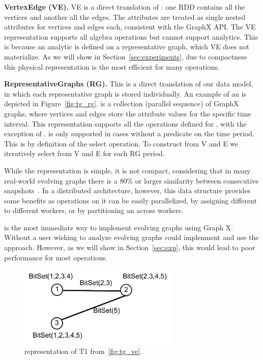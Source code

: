 {\bf VertexEdge (VE).} VE is a direct translation of \tve: one RDD
contains all the vertices and another all the edges.  The attributes
are treated as single nested attributes for vertices and edges each,
consistent with the GraphX API.  The VE representation supports all \tg algebra
operations but cannot support analytics.  This is because an analytic
is defined on a representative graph, which VE does not materialize.
As we will show in Section~\ref{sec:experiments}, due to compactness
this physical representation is the most efficient for many
operations.

{\bf RepresentativeGraphs (RG).} This is a direct translation of our
\rg data model, in which each representative graph is stored
individually.  An example of an \rg is depicted in
Figure~\ref{fig:tg_rg}.  \rg is a collection (parallel sequence) of
GraphX graphs, where vertices and edges store the attribute values for
the specific time interval.  This representation supports all the
operations defined for \tgs, with the exception of
.  is only supported in cases without a
predicate on the time period.  This is by definition of the select
operation.  To construct \rg from V and E we iteratively select from V
and E for each RG period.

While the \rg representation is simple, it is not compact, considering
that in many real-world evolving graphs there is a 80\% or larger
similarity between consecutive
snapshots~\cite{DBLP:journals/tos/MiaoHLWYZPCC15}.  In a distributed
architecture, however, this data structure provides some benefits as
operations on it can be easily parallelized, by assigning different
\rgs to different workers, or by partitioning an \rg across workers.

\rg is the most immediate way to implement evolving graphs using Graph
X. Without \ql a user wishing to analyze evolving graphs could
implenment and use the \rg approach.  However, as we will show in
Section~\ref{sec:exp}, this would lead to poor performance for most
operations.

\begin{figure}[t!]
\includegraphics[width=3in]{figs/ogc.pdf}
\caption{\og representation of T1 from~\ref{fig:tg_ve}.}
\label{fig:ogc}
\end{figure}

